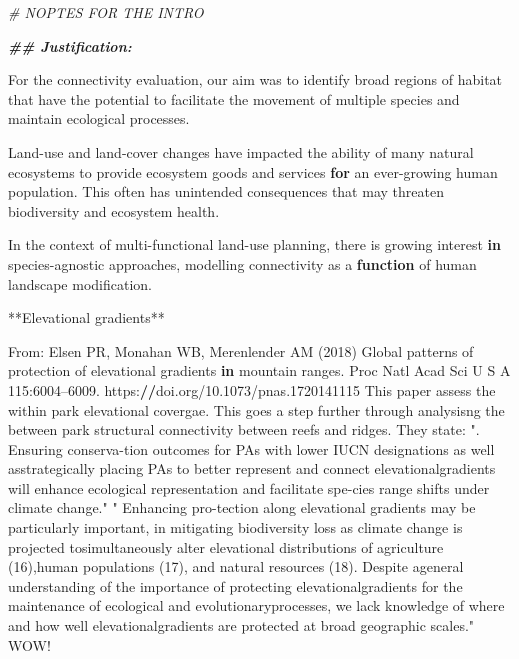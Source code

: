 \documentclass[
]{book}
\newenvironment{Shaded}{\begin{snugshade}}{\end{snugshade}}
\newcommand{\CommentTok}[1]{\textcolor[rgb]{0.56,0.35,0.01}{\textit{#1}}}
\newcommand{\ControlFlowTok}[1]{\textcolor[rgb]{0.13,0.29,0.53}{\textbf{#1}}}
\newcommand{\DecValTok}[1]{\textcolor[rgb]{0.00,0.00,0.81}{#1}}
\newcommand{\DocumentationTok}[1]{\textcolor[rgb]{0.56,0.35,0.01}{\textbf{\textit{#1}}}}
\newcommand{\ErrorTok}[1]{\textcolor[rgb]{0.64,0.00,0.00}{\textbf{#1}}}
\newcommand{\FloatTok}[1]{\textcolor[rgb]{0.00,0.00,0.81}{#1}}
\newcommand{\FunctionTok}[1]{\textcolor[rgb]{0.00,0.00,0.00}{#1}}
\newcommand{\NormalTok}[1]{#1}
\newcommand{\SpecialCharTok}[1]{\textcolor[rgb]{0.00,0.00,0.00}{#1}}
\newcommand{\StringTok}[1]{\textcolor[rgb]{0.31,0.60,0.02}{#1}}
\begin{document}
\begin{Shaded}
\begin{Highlighting}[]
\CommentTok{\# NOPTES FOR THE INTRO}

\DocumentationTok{\#\# Justification:}


\NormalTok{For the connectivity evaluation, our aim was to identify broad regions of habitat that have the}
\NormalTok{potential to facilitate the movement of multiple species and maintain ecological processes.}


\NormalTok{Land}\SpecialCharTok{{-}}\NormalTok{use and land}\SpecialCharTok{{-}}\NormalTok{cover changes have impacted the ability of many natural ecosystems to provide ecosystem goods and services }\ControlFlowTok{for}\NormalTok{ an ever}\SpecialCharTok{{-}}\NormalTok{growing human population. This often has unintended consequences that may threaten biodiversity and ecosystem health.}





\NormalTok{ In the context of multi}\SpecialCharTok{{-}}\NormalTok{functional land}\SpecialCharTok{{-}}\NormalTok{use planning, there is growing interest }\ControlFlowTok{in}\NormalTok{ species}\SpecialCharTok{{-}}\NormalTok{agnostic approaches, modelling connectivity as a }\ControlFlowTok{function}\NormalTok{ of human landscape modification. }



\SpecialCharTok{**}\NormalTok{Elevational gradients}\SpecialCharTok{**}

\NormalTok{From}\SpecialCharTok{:}\NormalTok{ Elsen PR, Monahan WB, Merenlender }\FunctionTok{AM}\NormalTok{ (}\DecValTok{2018}\NormalTok{) Global patterns of protection of elevational gradients }\ControlFlowTok{in}\NormalTok{ mountain ranges. Proc Natl Acad Sci U S A }\DecValTok{115}\SpecialCharTok{:}\NormalTok{6004–}\FloatTok{6009.}\NormalTok{ https}\SpecialCharTok{:}\ErrorTok{//}\NormalTok{doi.org}\SpecialCharTok{/}\FloatTok{10.1073}\SpecialCharTok{/}\NormalTok{pnas}\FloatTok{.1720141115}
\NormalTok{      This paper assess the within park elevational covergae. This goes a step further through analysisng the between park structural connectivity between reefs and ridges. They state}\SpecialCharTok{:} \StringTok{". Ensuring conserva{-}tion outcomes for PAs with lower IUCN designations as well asstrategically placing PAs to better represent and connect elevationalgradients will enhance ecological representation and facilitate spe{-}cies range shifts under climate change."} \StringTok{"  Enhancing pro{-}tection along elevational gradients may be particularly important, in mitigating biodiversity loss as climate change is projected tosimultaneously alter elevational distributions of agriculture (16),human populations (17), and natural resources (18). Despite ageneral understanding of the importance of protecting elevationalgradients for the maintenance of ecological and evolutionaryprocesses, we lack knowledge of where and how well elevationalgradients are protected at broad geographic scales."}\NormalTok{ WOW}\SpecialCharTok{!}




\end{Highlighting}
\end{Shaded}
\end{document}
